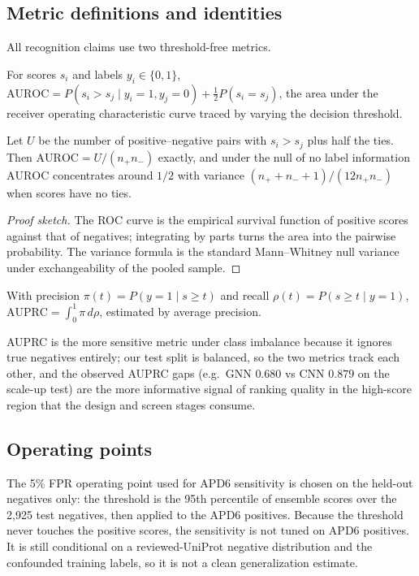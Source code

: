 \subsection{Metric definitions and identities}
All recognition claims use two threshold-free metrics.
\begin{definition}[AUROC]
For scores $s_i$ and labels $y_i\in\{0,1\}$,
$\mathrm{AUROC} = P(s_i > s_j \mid y_i{=}1, y_j{=}0) + \tfrac12 P(s_i = s_j)$,
the area under the receiver operating characteristic curve traced by varying
the decision threshold.
\end{definition}
\begin{proposition}\label{prop:mw}
Let $U$ be the number of positive--negative pairs with $s_i > s_j$ plus half
the ties. Then $\mathrm{AUROC} = U/(n_+ n_-)$ exactly, and under the null of
no label information $\mathrm{AUROC}$ concentrates around $1/2$ with
variance $(n_+ + n_- + 1)/(12 n_+ n_-)$ when scores have no ties.
\end{proposition}
\begin{proof}[Proof sketch]
The ROC curve is the empirical survival function of positive scores against
that of negatives; integrating by parts turns the area into the pairwise
probability. The variance formula is the standard Mann--Whitney null variance
under exchangeability of the pooled sample.
\end{proof}
\begin{definition}[AUPRC]
With precision $\pi(t) = P(y{=}1 \mid s \ge t)$ and recall
$\rho(t) = P(s \ge t \mid y{=}1)$, $\mathrm{AUPRC} = \int_0^1 \pi\, d\rho$,
estimated by average precision.
\end{definition}
AUPRC is the more sensitive metric under class imbalance because it ignores
true negatives entirely; our test split is balanced, so the two metrics track
each other, and the observed AUPRC gaps (e.g.\ GNN $0.680$ vs CNN $0.879$ on
the scale-up test) are the more informative signal of ranking quality in the
high-score region that the design and screen stages consume.

\subsection{Operating points}
The 5\% FPR operating point used for APD6 sensitivity is chosen on the
held-out negatives only: the threshold is the 95th percentile of ensemble
scores over the 2{,}925 test negatives, then applied to the APD6 positives.
Because the threshold never touches the positive scores, the sensitivity is not tuned on APD6 positives. It is still conditional on a reviewed-UniProt negative distribution and the confounded training labels, so it is not a clean generalization estimate.
